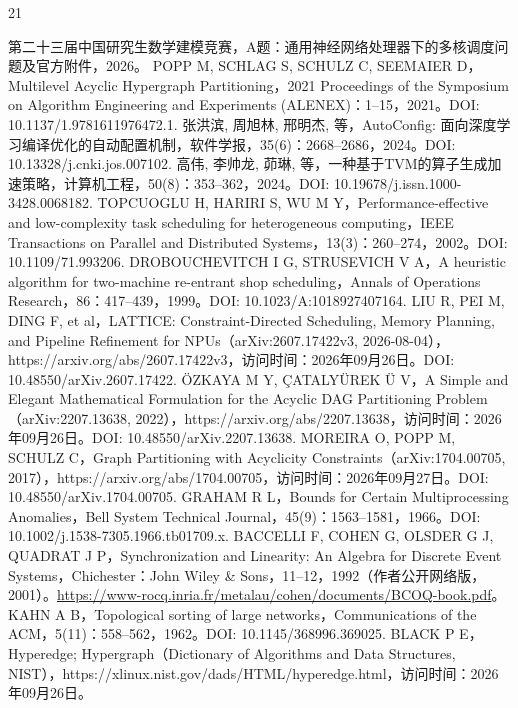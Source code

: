 \documentclass[anonymous,withtoc]{gmcm2026}
\begin{document}
\FloatBarrier
\clearpage\begin{thebibliography}{21}
\raggedright
{} 第二十三届中国研究生数学建模竞赛，A题：通用神经网络处理器下的多核调度问题及官方附件，2026。
 POPP M, SCHLAG S, SCHULZ C, SEEMAIER D，Multilevel Acyclic Hypergraph Partitioning，2021 Proceedings of the Symposium on Algorithm Engineering and Experiments (ALENEX)：1--15，2021。DOI: 10.1137/1.9781611976472.1.
 张洪滨, 周旭林, 邢明杰, 等，AutoConfig: 面向深度学习编译优化的自动配置机制，软件学报，35(6)：2668--2686，2024。DOI: 10.13328/j.cnki.jos.007102.
 高伟, 李帅龙, 茆琳, 等，一种基于TVM的算子生成加速策略，计算机工程，50(8)：353--362，2024。DOI: 10.19678/j.issn.1000-3428.0068182.
 TOPCUOGLU H, HARIRI S, WU M Y，Performance-effective and low-complexity task scheduling for heterogeneous computing，IEEE Transactions on Parallel and Distributed Systems，13(3)：260--274，2002。DOI: 10.1109/71.993206.
 DROBOUCHEVITCH I G, STRUSEVICH V A，A heuristic algorithm for two-machine re-entrant shop scheduling，Annals of Operations Research，86：417--439，1999。DOI: 10.1023/A:1018927407164.
 LIU R, PEI M, DING F, et al，LATTICE: Constraint-Directed Scheduling, Memory Planning, and Pipeline Refinement for NPUs（arXiv:2607.17422v3, 2026-08-04），https://arxiv.org/abs/2607.17422v3，访问时间：2026年09月26日。DOI: 10.48550/arXiv.2607.17422.
 ÖZKAYA M Y, ÇATALYÜREK Ü V，A Simple and Elegant Mathematical Formulation for the Acyclic DAG Partitioning Problem（arXiv:2207.13638, 2022），https://arxiv.org/abs/2207.13638，访问时间：2026年09月26日。DOI: 10.48550/arXiv.2207.13638.
 MOREIRA O, POPP M, SCHULZ C，Graph Partitioning with Acyclicity Constraints（arXiv:1704.00705, 2017），https://arxiv.org/abs/1704.00705，访问时间：2026年09月27日。DOI: 10.48550/arXiv.1704.00705.
 GRAHAM R L，Bounds for Certain Multiprocessing Anomalies，Bell System Technical Journal，45(9)：1563--1581，1966。DOI: 10.1002/j.1538-7305.1966.tb01709.x.
 BACCELLI F, COHEN G, OLSDER G J, QUADRAT J P，Synchronization and Linearity: An Algebra for Discrete Event Systems，Chichester：John Wiley \& Sons，11--12，1992（作者公开网络版，2001）。\url{https://www-rocq.inria.fr/metalau/cohen/documents/BCOQ-book.pdf}。
 KAHN A B，Topological sorting of large networks，Communications of the ACM，5(11)：558--562，1962。DOI: 10.1145/368996.369025.
 BLACK P E，Hyperedge; Hypergraph（Dictionary of Algorithms and Data Structures, NIST），https://xlinux.nist.gov/dads/HTML/hyperedge.html，访问时间：2026年09月26日。

\end{thebibliography}
\end{document}
